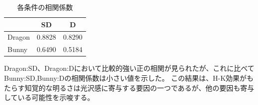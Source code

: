     \begin{table}[h]
        \centering
        \caption{各条件の相関係数}
        \begin{tabular}{|l||c|c|} \hline
                        & SD       & D        \\ \hline \hline
            Dragon      & 0.8828   & 0.8290   \\ \hline
            Bunny       & 0.6490   & 0.5184   \\ \hline
        \end{tabular}
    \end{table}

    Dragon:SD、Dragon:Dにおいて比較的強い正の相関が見られたが、これに比べてBunny:SD,Bunny:Dの相関係数は小さい値を示した。
    この結果は、H-K効果がもたらす知覚的な明るさは光沢感に寄与する要因の一つであるが、他の要因も寄与している可能性を示唆する。